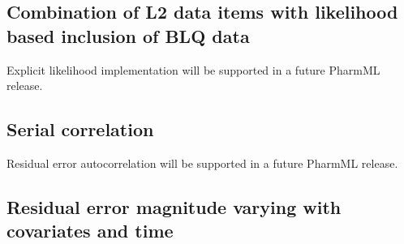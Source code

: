 \documentclass[a4paper,10pt]{article}
\begin{document}
\subsection{Combination of L2 data items with likelihood based inclusion of BLQ data}
\label{modelKK_RM3}
Explicit likelihood implementation will be supported in a future PharmML release.

\subsection{Serial correlation}
\label{modelKK_RM4}
Residual error autocorrelation will be supported in a future PharmML release.

\subsection{Residual error magnitude varying with covariates and time}
\label{modelKK_RM5}
\end{document}
